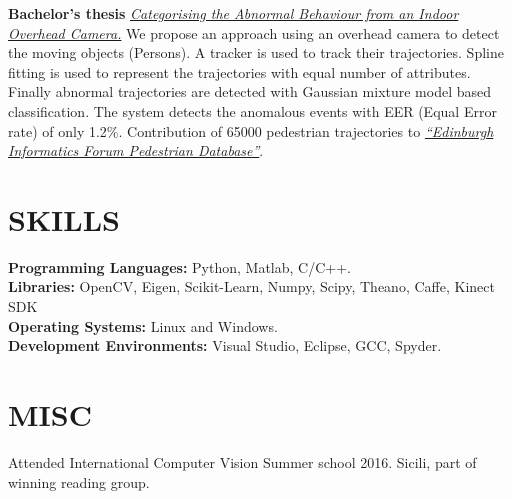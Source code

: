 \documentclass[line, margin]{res}
\begin{document}
\begin{resume}
\textbf{Bachelor's thesis} \href{https://sites.google.com/site/gurkirtcv/research/btechproject}{\emph{Categorising the Abnormal Behaviour from an Indoor Overhead Camera.}}
We propose an approach using an overhead camera to detect the moving objects (Persons). A tracker is used to track their trajectories. 
Spline fitting is used to represent the trajectories with equal number of attributes. 
Finally abnormal trajectories are detected with Gaussian mixture model based classification. 
The system detects the anomalous events with EER (Equal Error rate) of only 1.2\%. 
Contribution of 65000 pedestrian trajectories to \href{http://homepages.inf.ed.ac.uk/rbf/FORUMTRACKING/}{\emph{“Edinburgh Informatics Forum Pedestrian Database”}}.

\section{SKILLS}
\textbf{Programming Languages:} Python, Matlab, C/C++.\\
\textbf{Libraries:} OpenCV, Eigen, Scikit-Learn, Numpy, Scipy, Theano, Caffe, Kinect SDK\\
\textbf{Operating Systems:} Linux and Windows.\\
\textbf{Development Environments:} Visual Studio, Eclipse, GCC, Spyder.\\


\section{MISC}
Attended International Computer Vision  Summer school 2016. Sicili, part of winning reading group.
\end{resume}
\end{document}
